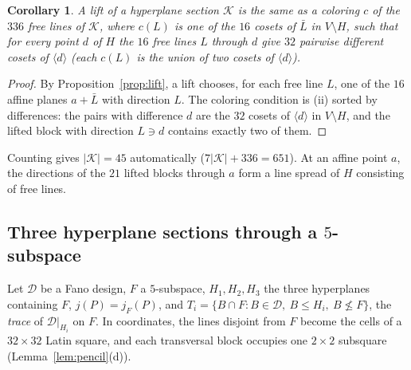 \documentclass[11pt]{amsart}
\newtheorem{corollary}[theorem]{Corollary}
\theoremstyle{definition}
\newcommand{\D}{\mathcal{D}}
\newcommand{\K}{\mathcal{K}}
\begin{document}
\begin{corollary}
A lift of a hyperplane section $\K$ is the same as a coloring $c$ of the $336$ free lines of $\K$, where $c(L)$ is one of the $16$ cosets of $\bar L$ in $V\setminus H$, such that for every point $d$ of $H$ the $16$ free lines $L$ through $d$ give $32$ pairwise different cosets of $\langle d\rangle$ \textup{(}each $c(L)$ is the union of two cosets of $\langle d\rangle$\textup{)}.
\end{corollary}
\begin{proof}
By Proposition~\ref{prop:lift}, a lift chooses, for each free line $L$, one of the $16$ affine planes $a+\bar L$ with direction $L$. The coloring condition is (ii) sorted by differences: the pairs with difference $d$ are the $32$ cosets of $\langle d\rangle$ in $V\setminus H$, and the lifted block with direction $L\ni d$ contains exactly two of them.
\end{proof}

Counting gives $|\K|=45$ automatically ($7|\K|+336=651$). At an affine point $a$, the directions of the $21$ lifted blocks through $a$ form a line spread of $H$ consisting of free lines.

\subsection{\texorpdfstring{Three hyperplane sections through a $5$-subspace}{Three hyperplane sections through a 5-subspace}}
Let $\D$ be a Fano design, $F$ a $5$-subspace, $H_1,H_2,H_3$ the three hyperplanes containing $F$, $j(P)=j_F(P)$, and $T_i=\{B\cap F: B\in\D,\ B\le H_i,\ B\not\le F\}$, the \emph{trace} of $\D|_{H_i}$ on $F$. In coordinates, the lines disjoint from $F$ become the cells of a $32\times32$ Latin square, and each transversal block occupies one $2\times2$ subsquare (Lemma~\ref{lem:pencil}(d)).
\end{document}
